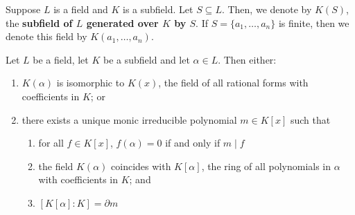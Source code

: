 \begin{definition}
    Suppose $L$ is a field and $K$ is a subfield. Let $S\subseteq L$. Then, we denote by $K(S)$, the \textbf{subfield of $L$ generated over $K$ by $S$}. If $S = \{a_1,\ldots,a_n\}$ is finite, then we denote this field by $K(a_1,\ldots,a_n)$.
\end{definition}

\begin{theorem}
    Let $L$ be a field, let $K$ be a subfield and let $\alpha\in L$. Then either:
    \begin{enumerate}
        \item $K(\alpha)$ is isomorphic to $K(x)$, the field of all rational forms with coefficients in $K$; or 
        \item there exists a unique monic irreducible polynomial $m\in K[x]$ such that 
        \begin{enumerate}
            \item for all $f\in K[x]$, $f(\alpha) = 0$ if and only if $m\mid f$ 
            \item the field $K(\alpha)$ coincides with $K[\alpha]$, the ring of all polynomials in $\alpha$ with coefficients in $K$; and 
            \item $[K[\alpha]:K] = \partial m$
        \end{enumerate}
    \end{enumerate}
\end{theorem}

